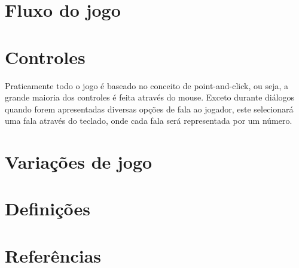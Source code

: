 \section{Fluxo do jogo}
\section{Controles}
Praticamente todo o jogo é baseado no conceito de point-and-click, ou seja, a grande maioria dos controles é feita através do mouse. Exceto durante diálogos quando forem apresentadas diversas opções de fala ao jogador, este selecionará uma fala através do teclado, onde cada fala será representada por um número.
\section{Variações de jogo}
\section{Definições}
\section{Referências}
